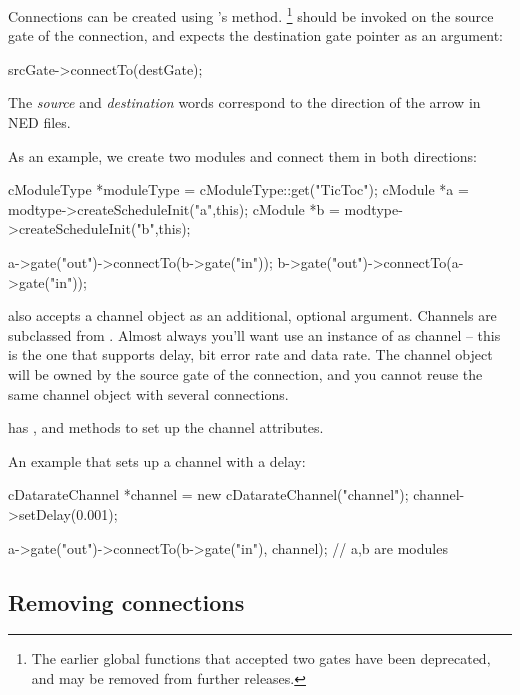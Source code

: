 Connections can be created using 's 
method.
  \footnote{The earlier  global functions that
  accepted two gates have been deprecated, and may be removed
  from further {\opp} releases.}
 should be invoked on the source gate
of the connection, and expects the destination gate pointer as
an argument:

\begin{cpp}
srcGate->connectTo(destGate);
\end{cpp}

The \textit{source} and \textit{destination} words correspond
to the direction of the arrow in NED files.

As an example, we create two modules and connect them in both directions:

\begin{cpp}
cModuleType *moduleType = cModuleType::get("TicToc");
cModule *a = modtype->createScheduleInit("a",this);
cModule *b = modtype->createScheduleInit("b",this);

a->gate("out")->connectTo(b->gate("in"));
b->gate("out")->connectTo(a->gate("in"));
\end{cpp}

 also accepts a channel object as an
additional, optional argument. Channels are subclassed from
. Almost always you'll want use an instance of
 as channel -- this is the one that supports
delay, bit error rate 
and data rate. The channel object will
be owned by the source gate of the connection, and you cannot
reuse the same channel object with several connections.

 has , 
and  methods to set up the channel attributes.

An example that sets up a channel with a delay:

\begin{cpp}
cDatarateChannel *channel = new cDatarateChannel("channel");
channel->setDelay(0.001);

a->gate("out")->connectTo(b->gate("in"), channel); // a,b are modules
\end{cpp}


\subsection{Removing connections}

